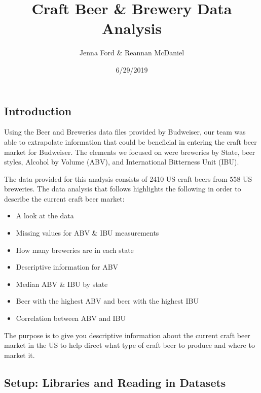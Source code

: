 \documentclass[]{article}
\title{Craft Beer \& Brewery Data Analysis}
\author{Jenna Ford \& Reannan McDaniel}
\date{6/29/2019}
\providecommand{\tightlist}{%
  \setlength{\itemsep}{0pt}\setlength{\parskip}{0pt}}
\begin{document}
\maketitle

\hypertarget{introduction}{%
\subsection{Introduction}\label{introduction}}

Using the Beer and Breweries data files provided by Budweiser, our team
was able to extrapolate information that could be beneficial in entering
the craft beer market for Budweiser. The elements we focused on were
breweries by State, beer styles, Alcohol by Volume (ABV), and
International Bitterness Unit (IBU).

The data provided for this analysis consists of 2410 US craft beers from
558 US breweries. The data analysis that follows highlights the
following in order to describe the current craft beer market:

\begin{itemize}
\tightlist
\item
  A look at the data
\item
  Missing values for ABV \& IBU measurements
\item
  How many breweries are in each state
\item
  Descriptive information for ABV
\item
  Median ABV \& IBU by state
\item
  Beer with the highest ABV and beer with the highest IBU
\item
  Correlation between ABV and IBU
\end{itemize}

The purpose is to give you descriptive information about the current
craft beer market in the US to help direct what type of craft beer to
produce and where to market it.

\hypertarget{setup-libraries-and-reading-in-datasets}{%
\subsection{Setup: Libraries and Reading in
Datasets}\label{setup-libraries-and-reading-in-datasets}}
\end{document}
